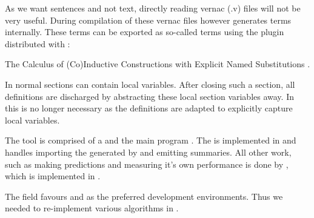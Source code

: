 As we want \pcic sentences and not \gallina text, directly reading \coq vernac (.v) files will not be very useful.
During compilation of these vernac files \coq however generates \pcic terms internally.
These \pcic terms can be exported as so-called \acic terms using the \xml plugin distributed with \coq:
\begin{definition}[\acic]
	The Calculus of (Co)Inductive Constructions with Explicit Named Substitutions \cite{coen2000progettazione}.

	In normal \cic sections can contain local variables.
	After closing such a section, all definitions are discharged by abstracting these local section variables away.
	In \acic this is no longer necessary as the definitions are adapted to explicitly capture local variables.
\end{definition}

The tool is comprised of a \preloader and the main program \roerei.
The \preloader is implemented in \ocaml and handles importing the \xml generated by \coq and emitting summaries.
All other work, such as making predictions and measuring it's own performance is done by \roerei, which is implemented in \cpp.

The \machinelearning field favours \python and \matlab as the preferred development environments.
Thus we needed to re-implement various \machinelearning algorithms in \cpp.

